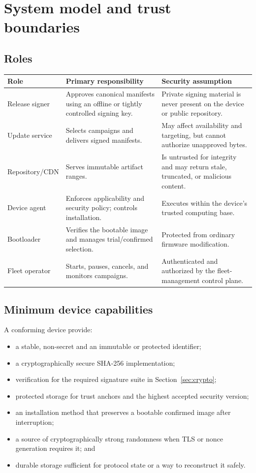 \section{System model and trust boundaries}

\subsection{Roles}

\begin{tabularx}{\textwidth}{@{}L{31mm}Y Y@{}}
  \toprule
  \textbf{Role} & \textbf{Primary responsibility} & \textbf{Security assumption} \\
  \midrule
  Release signer & Approves canonical manifests using an offline or tightly
    controlled signing key. & Private signing material is never present on the
    device or public repository. \\
  Update service & Selects campaigns and delivers signed manifests. & May affect
    availability and targeting, but cannot authorize unapproved bytes. \\
  Repository/CDN & Serves immutable artifact ranges. & Is untrusted for integrity
    and may return stale, truncated, or malicious content. \\
  Device agent & Enforces applicability and security policy; controls installation.
    & Executes within the device's trusted computing base. \\
  Bootloader & Verifies the bootable image and manages trial/confirmed selection.
    & Protected from ordinary firmware modification. \\
  Fleet operator & Starts, pauses, cancels, and monitors campaigns. & Authenticated
    and authorized by the fleet-management control plane. \\
  \bottomrule
\end{tabularx}

\subsection{Minimum device capabilities}

A conforming device \must provide:

\begin{itemize}
  \item a stable, non-secret  and an immutable or protected
         identifier;
  \item a cryptographically secure SHA-256 implementation;
  \item verification for the required signature suite in Section~\ref{sec:crypto};
  \item protected storage for trust anchors and the highest accepted security version;
  \item an installation method that preserves a bootable confirmed image after interruption;
  \item a source of cryptographically strong randomness when TLS or nonce generation requires it; and
  \item durable storage sufficient for protocol state or a way to reconstruct it safely.
\end{itemize}

